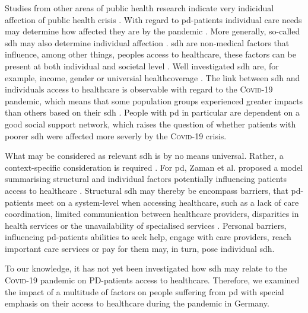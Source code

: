 \documentclass{bmcart}
\begin{document}
Studies from other areas of public health research indicate very indicidual affection of public health crisis \cite{huijts2017prevalence, lowcock2012social}. With regard to \ac{pd}-patients individual care needs may determine how affected they are by the pandemic \cite{frundt2022impact}. More generally, so-called \ac{sdh} may also determine individual affection \cite{brown2020effect}. \ac{sdh} are non-medical factors that influence, among other things, peoples access to healthcare, these factors can be present at both individual and societal level \cite{world2010conceptual}. Well investigated  \ac{sdh} are, for example, income, gender or universial healthcoverage \cite{marmot2005social, paremoer2021covid}. The link between \ac{sdh} and individuals access to healthcare is observable with regard to the \textsc{Covid}-19 pandemic, which means that some population groups experienced greater impacts than others based on their \ac{sdh} \cite{whocovidbrief}. People with \ac{pd} in particular are dependent on a good social support network, which raises the question of whether patients with poorer \ac{sdh} were affected more severly by the \textsc{Covid}-19 crisis.

What may be considered as relevant \ac{sdh} is by no means universal. Rather, a context-specific consideration is required \cite{world2010conceptual}. For \ac{pd}, Zaman et al. proposed a model summarising structural and individual factors potentially influencing patients access to healthcare \cite{zaman2021barriers}. Structural \ac{sdh} may thereby be encompass barriers, that \ac{pd}-patients meet on a system-level when accessing healthcare, such as a lack of care coordination, limited communication between healthcare providers, disparities in health services or the unavailability of specialised services \cite{zaman2021barriers}. Personal barriers, influencing \ac{pd}-patients abilities  to seek help, engage with care providers, reach important care services or pay for them \cite{zaman2021barriers} may, in turn, pose individual \ac{sdh}.

To our knowledge, it has not yet been investigated how \ac{sdh} may relate to the \textsc{Covid}-19 pandemic on PD-patients access to healthcare. Therefore, we examined the impact of a multitude of factors on people suffering from \ac{pd} with special emphasis on their access to healthcare during the pandemic in Germany. 

\newpage
\end{document}
